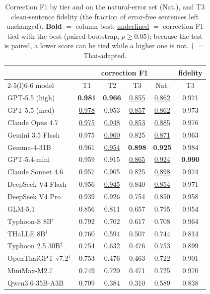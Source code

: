 \documentclass[11pt]{article}
\newcommand{\tie}[1]{\underline{#1}}
\begin{document}
\begin{table}[t]
\centering\small\setlength{\tabcolsep}{3.2pt}
\begin{tabular}{@{}lccccc@{}}
\toprule
 & \multicolumn{4}{c}{correction F1} & fidelity \\
\cmidrule(lr){2-5}\cmidrule(l){6-6}
model & T1 & T2 & T3 & Nat. & T3 \\
\midrule
GPT-5.5 (high)            & \textbf{0.981} & \textbf{0.966} & \tie{0.855} & \tie{0.862} & 0.971 \\
GPT-5.5 (med)             & \tie{0.978} & 0.953 & \tie{0.857} & \tie{0.862} & 0.973 \\
Claude Opus 4.7           & \tie{0.975} & \tie{0.948} & \tie{0.853} & \tie{0.885} & 0.976 \\
Gemini 3.5 Flash          & 0.975 & \tie{0.960} & 0.825 & \tie{0.871} & 0.963 \\
Gemma-4-31B               & 0.961 & \tie{0.954} & \textbf{0.898} & \textbf{0.925} & 0.984 \\
GPT-5.4-mini              & 0.959 & 0.915 & \tie{0.865} & \tie{0.924} & \textbf{0.990} \\
Claude Sonnet 4.6         & 0.957 & 0.905 & 0.825 & \tie{0.898} & 0.974 \\
DeepSeek V4 Flash         & 0.956 & \tie{0.945} & 0.840 & \tie{0.854} & 0.971 \\
DeepSeek V4 Pro           & 0.939 & 0.926 & 0.754 & 0.850 & 0.958 \\
GLM-5.1                   & 0.856 & 0.811 & 0.657 & 0.795 & 0.954 \\
Typhoon-S 8B$^\dagger$    & 0.792 & 0.702 & 0.617 & 0.708 & 0.964 \\
THaLLE 8B$^\dagger$       & 0.760 & 0.594 & 0.507 & 0.744 & 0.814 \\
Typhoon 2.5 30B$^\dagger$ & 0.754 & 0.632 & 0.476 & 0.753 & 0.899 \\
OpenThaiGPT v7.2$^\dagger$& 0.753 & 0.476 & 0.463 & 0.722 & 0.901 \\
MiniMax-M2.7              & 0.749 & 0.720 & 0.471 & 0.725 & 0.970 \\
Qwen3.6-35B-A3B           & 0.709 & 0.384 & 0.310 & 0.589 & 0.838 \\
\bottomrule
\end{tabular}
\caption{Correction F1 by tier and on the natural-error set (Nat.), and T3 clean-sentence
fidelity (the fraction of error-free sentences left unchanged). \textbf{Bold} $=$ column best;
\underline{underlined} $=$ correction F1 tied with the best (paired bootstrap, $p \ge 0.05$);
because the test is paired, a lower score can be tied while a higher one is not. $\dagger$ $=$
Thai-adapted.}
\label{tab:main}
\end{table}
\end{document}
